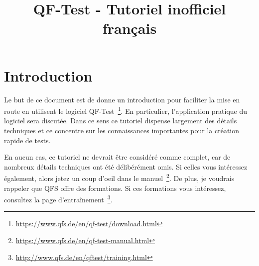 \documentclass{article}
\begin{document}
\title{QF-Test - Tutoriel inofficiel français}
\maketitle
\newpage

\tableofcontents
\newpage

\section{Introduction}
\par{
Le but de ce document est de donne un introduction pour faciliter la mise en route en utilisent le logiciel
QF-Test~\footnote{\url{https://www.qfs.de/en/qf-test/download.html}}. En particulier, l'application pratique
du logiciel sera discutée. Dans ce sens ce tutoriel dispense largement des détails techniques et ce concentre
sur les connaissances importantes pour la création rapide de tests.
}
\par{
En aucun cas, ce tutoriel ne devrait être considéré comme complet, car de nombreux détails techniques ont été
délibérément omis. Si celles vous intéressez également, alors jetez un coup d'oeil dans le
manuel~\footnote{\url{https://www.qfs.de/en/qf-test-manual.html}}. De plus, je voudrais rappeler que QFS
offre des formations. Si ces formations vous intéressez, consultez
la page d'entraînement~\footnote{\url{http://www.qfs.de/en/qftest/training.html}}.
}
\newpage
\end{document}
